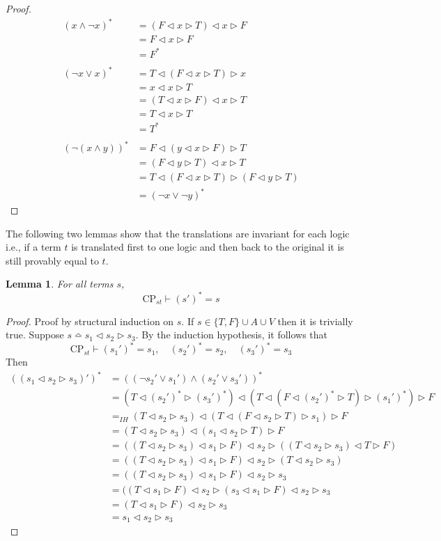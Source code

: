 \documentclass[a4paper,twoside,openright]{report}
\newcommand{\syn}{\bumpeq}
\newcommand{\lef}{\ensuremath{\triangleleft}}
\newcommand{\rig}{\ensuremath{\triangleright}}
\newtheorem{lem}[theorem]{Lemma}
\begin{document}
\begin{proof}
\begin{align*}
(x\wedge\neg x)^*
&=(F\lef x\rig T)\lef x\rig F\\
&=F\lef x\rig F\\
&=F^*\\\\
(\neg x\vee x)^*
&= T\lef (F\lef x\rig T)\rig x\\
&= x\lef x\rig T\\
&= (T\lef x\rig F)\lef x\rig T\\
&= T\lef x\rig T\\
&= T^*\\\\
(\neg(x\wedge y))^*
&=F\lef(y\lef x\rig F)\rig T\\
&=(F\lef y\rig T)\lef x\rig T\\
&=T\lef(F\lef x\rig T)\rig(F\lef y\rig T)\\
&=(\neg x\vee\neg y)^*
\end{align*}
\end{proof}

The following two lemmas show that the translations are invariant for each logic i.e., if a term $t$ is translated first to one logic and then back to the original it is still provably equal to $t$.
\begin{lem}\label{trans invariance CPst lem}
For all terms $s$, 
\[
\text{CP}_{st}\vdash(s')^*=s
\]
\end{lem}
\begin{proof}
Proof by structural induction on $s$. If $s\in\{T,F\}\cup A\cup V$ then it is trivially true. Suppose $s\syn s_1\lef s_2\rig s_3$. By the induction hypothesis, it follows that
\[
\text{CP}_{st}\vdash(s_1')^*=s_1,\quad(s_2')^*=s_2,\quad(s_3')^*=s_3
\]
Then
\begin{align*}
((s_1\lef s_2\rig s_3)')^*
&=((\neg s_2'\vee s_1')\wedge(s_2'\vee s_3'))^*\\
&=(T\lef (s_2')^*\rig(s_3')^*)\lef(T\lef(F\lef(s_2')^*\rig T)\rig (s_1')^*)\rig F\\
&=_{IH}(T\lef s_2\rig s_3)\lef(T\lef(F\lef s_2\rig T)\rig s_1)\rig F\\
&=(T\lef s_2\rig s_3)\lef(s_1\lef s_2\rig T)\rig F\\
&=((T\lef s_2\rig s_3)\lef s_1\rig F)\lef s_2\rig ((T\lef s_2\rig s_3)\lef T \rig F)\\
&=((T\lef s_2\rig s_3)\lef s_1\rig F)\lef s_2\rig (T\lef s_2\rig s_3)\\
&=((T\lef s_2\rig s_3)\lef s_1\rig F)\lef s_2\rig s_3\\
&=((T\lef s_1\rig F)\lef s_2\rig(s_3\lef s_1\rig F)\lef s_2\rig s_3\\
&=(T\lef s_1\rig F)\lef s_2\rig s_3\\
&=s_1\lef s_2\rig s_3
\end{align*}
\end{proof}
\end{document}
